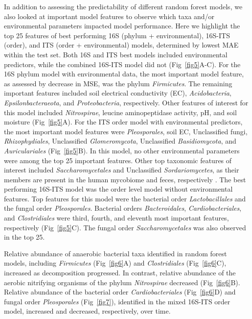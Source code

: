 \documentclass[
  10pt,
  letterpaper,
]{article}
\begin{document}
In addition to assessing the predictability of different random forest
models, we also looked at important model features to observe which taxa
and/or environmental parameters impacted model performance. Here we
highlight the top 25 features of best performing 16S (phylum +
environmental), 16S-ITS (order), and ITS (order + environmental) models,
determined by lowest MAE within the test set. Both 16S and ITS best
models included environmental predictors, while the combined 16S-ITS
model did not (Fig~\ref{fig5}A-C). For the 16S phylum model with
environmental data, the most important model feature, as assessed by
decrease in MSE, was the phylum \emph{Firmicutes}. The remaining
important features included soil electrical conductivity (EC),
\emph{Acidobacteria}, \emph{Epsilonbacteraeota}, and
\emph{Proteobacteria}, respectively. Other features of interest for this
model included \emph{Nitrospirae}, leucine aminopeptidase activity, pH,
and soil moisture (Fig~\ref{fig5}A). For the ITS order model with
environmental predictors, the most important model features were
\emph{Pleosporales}, soil EC, Unclassified fungi, \emph{Rhizophydiales},
Unclassified \emph{Glomeromycota}, Unclassified \emph{Basidiomycota},
and \emph{Auriculariales} (Fig~\ref{fig5}B). In this model, no other
environmental parameters were among the top 25 important features. Other
top taxonomic features of interest included \emph{Saccharomycetales} and
Unclassified \emph{Sordariomycetes}, as their members are present in the
human mycobiome and feces, respectively
\citep{blackwell_fungi_2004, taylor_ascomycota_2015}. The best
performing 16S-ITS model was the order level model without environmental
features. Top features for this model were the bacterial order
\emph{Lactobacillales} and the fungal order \emph{Pleosporales}.
Bacterial orders \emph{Bacteroidales}, \emph{Cardiobacteriales}, and
\emph{Clostridiales} were third, fourth, and eleventh most important
features, respectively (Fig~\ref{fig5}C). The fungal order
\emph{Saccharomycetales} was also observed in the top 25.

Relative abundance of anaerobic bacterial taxa identified in random
forest models, including \emph{Firmicutes} (Fig~\ref{fig6}A) and
\emph{Clostridiales} (Fig~\ref{fig6}C), increased as decomposition
progressed. In contrast, relative abundance of the aerobic nitrifying
organisms of the phylum \emph{Nitrospirae} decreased (Fig~\ref{fig6}B).
Relative abundance of the bacterial order \emph{Cardiobacteriales}
(Fig~\ref{fig6}D) and fungal order \emph{Pleosporales} (Fig~\ref{fig7}),
identified in the mixed 16S-ITS order model, increased and decreased,
respectively, over time.
\end{document}
